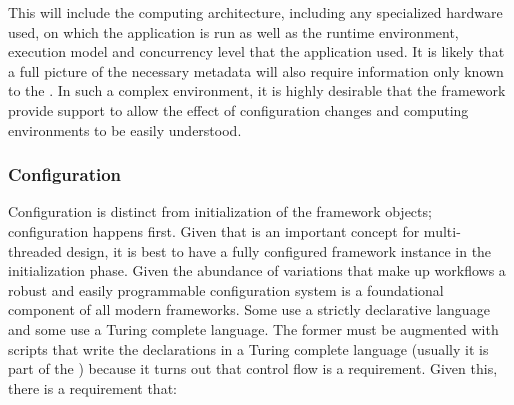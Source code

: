 \documentclass[../main-v1.tex]{subfiles}
\begin{document}





This will include the computing architecture, including any specialized hardware used, on which the application is run as well as the runtime environment, execution model and concurrency level that the application used.  It is likely that a full picture of the necessary metadata will also require information only known to the .  In such a complex environment, it is highly desirable that the framework provide support to allow the effect of configuration changes and computing environments to be easily understood.



\subsubsection{Configuration} \label{subsec:fworks:config}

Configuration is distinct from initialization of the framework objects; configuration happens first.  Given that  is an important concept for multi-threaded design, it is best to have a fully configured framework instance in the initialization phase.  Given the abundance of variations that make up  workflows a robust and easily programmable configuration system is a foundational component of all modern frameworks.  Some use a strictly declarative language and some use a Turing complete language.  The former must be augmented with scripts that write the declarations in a Turing complete language (usually it is part of the ) because it turns out that control flow is a requirement.  Given this, there is a requirement that:
\end{document}
